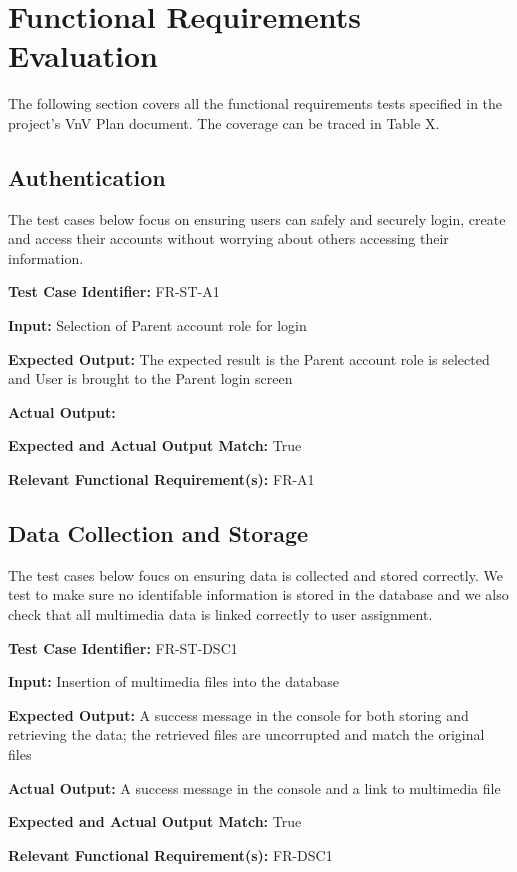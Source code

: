 \documentclass[12pt, titlepage]{article}
\begin{document}
\section{Functional Requirements Evaluation}
\hspace{2em}The following section covers all the functional requirements tests specified in the project's
VnV Plan document. The coverage can be traced in Table X.

\subsection{Authentication}
\hspace{2em}The test cases below focus on ensuring users can safely and securely login, create and
access their accounts without worrying about others accessing their information.

\begin{mdframed}[linewidth=0.5mm] \par
  \textbf{Test Case Identifier:} FR-ST-A1 \par
  \textbf{Input:} Selection of Parent account role for login \par
  \textbf{Expected Output:} The expected result is the Parent account role is selected and User is brought to the Parent login screen \par
  \textbf{Actual Output:} \par
  \textbf{Expected and Actual Output Match:} True \par
  \textbf{Relevant Functional Requirement(s):} FR-A1
\end{mdframed}

\subsection{Data Collection and Storage}
\hspace{2em}The test cases below foucs on ensuring data is collected and stored correctly. We test to make sure
no identifable information is stored in the database and we also check that all multimedia data is linked correctly to user assignment.

\begin{mdframed}[linewidth=0.5mm] \par
  \textbf{Test Case Identifier:} FR-ST-DSC1 \par
  \textbf{Input:} Insertion of multimedia files into the database \par
  \textbf{Expected Output:} A success message in the console for both storing and retrieving the data; the retrieved files are uncorrupted and match the original files \par
  \textbf{Actual Output:} A success message in the console and a link to multimedia file \par
  \textbf{Expected and Actual Output Match:} True \par
  \textbf{Relevant Functional Requirement(s):} FR-DSC1
\end{mdframed}
\end{document}
